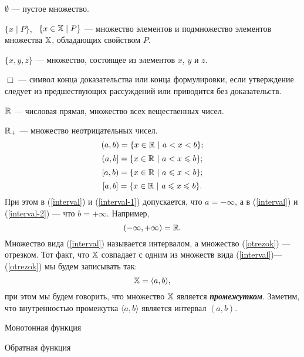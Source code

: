      $\emptyset$ --- пустое множество.

     $\{x\mid P\}$, \ $\{x\in\mathbb{X}\mid P\}$ --- множество элементов и
     подмножество элементов множества $\mathbb{X}$, обладающих свойством
     $P$.


     $\{x,y,z\}$ --- множество, состоящее из элементов $x$, $y$ и $z$.

     $\Box$ --- символ конца доказательства или конца формулировки,
     если утверждение следует из предшествующих рассуждений или
     приводится без доказательств.

     $\mathbb{R}$ --- числовая прямая, множество всех вещественных чисел.

     $\mathbb{R}_{+}$ --- множество неотрицательных чисел.
     \begin{equation}
\label{interval}
    (a,b)=\{x\in\mathbb{R} \ | \ a<x<b\};
\end{equation}
\begin{equation}
\label{interval-1}
    (a,b]=\{x\in\mathbb{R} \ | \ a<x\leqslant b\};
\end{equation}
\begin{equation}
\label{interval-2}
    [a,b)=\{x\in\mathbb{R} \ | \ a\leqslant x<b\};
\end{equation}
\begin{equation}
\label{otrezok}
    [a,b]=\{x\in\mathbb{R} \ | \ a\leqslant x\leqslant b\}.
\end{equation}
    При этом в (\ref{interval}) и (\ref{interval-1}) допускается, что $a=-\infty$,
    а в (\ref{interval}) и (\ref{interval-2}) --- что $b=+\infty$. Например,
    \[(-\infty,+\infty)=\mathbb{R}.\]
    Множество вида (\ref{interval})
    называется интервалом, а множество (\ref{otrezok}) --- отрезком.
    Тот факт, что $\mathbb{X}$ совпадает с
    одним из множеств вида (\ref{interval})---(\ref{otrezok}) мы
    будем записывать так:
    \[\mathbb{X}=\langle a,b\rangle,\]
    при этом мы будем говорить, что множество $\mathbb{X}$ является
    \emph{\textbf{промежутком}}. Заметим, что внутренностью промежутка $\langle
    a,b\rangle$ является интервал $(a,b)$.


    Монотонная функция


    Обратная функция




